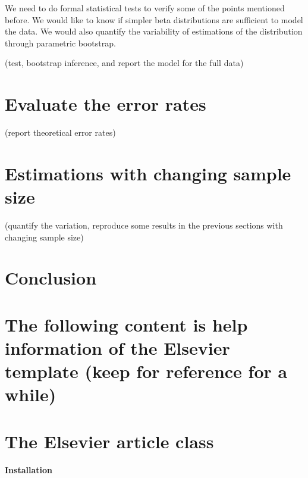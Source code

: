 \documentclass[]{elsarticle} %
\begin{document}
We need to do formal statistical tests to verify some of the points
mentioned before. We would like to know if simpler beta distributions
are sufficient to model the data. We would also quantify the variability
of estimations of the distribution through parametric bootstrap.

(test, bootstrap inference, and report the model for the full data)

\hypertarget{evaluate-the-error-rates}{%
\section{Evaluate the error rates}\label{evaluate-the-error-rates}}

(report theoretical error rates)

\hypertarget{estimations-with-changing-sample-size}{%
\section{Estimations with changing sample
size}\label{estimations-with-changing-sample-size}}

(quantify the variation, reproduce some results in the previous sections
with changing sample size)

\hypertarget{conclusion}{%
\section{Conclusion}\label{conclusion}}

\hypertarget{the-following-content-is-help-information-of-the-elsevier-template-keep-for-reference-for-a-while}{%
\section{The following content is help information of the Elsevier
template (keep for reference for a
while)}\label{the-following-content-is-help-information-of-the-elsevier-template-keep-for-reference-for-a-while}}

\hypertarget{the-elsevier-article-class}{%
\section{The Elsevier article class}\label{the-elsevier-article-class}}

\hypertarget{installation}{%
\paragraph{Installation}\label{installation}}
\end{document}
